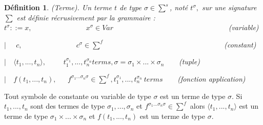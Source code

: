 \documentclass[9pt,openany]{book}
\newtheorem{definition}{D\'efinition}[section]
\begin{document}
\begin{definition} (Terme).
Un terme $t$ de type $\sigma \in \sum^{s}$, not\'e $t^{\sigma},$ sur une signature $\sum$ est d\'efinie r\'ecrusivement par la grammaire :\\
$t^{\sigma} ::= x,$ ~~~~~~~~~~~~~~$x^{\sigma} \in Var$ ~~~~~~~~~~~~~~~~~~~~~~~~~~~~~~ (variable) \par
$|$~~ $c,$ ~~~~~~~~~~~~~~$c^{\sigma} \in \sum^{f}$ ~~~~~~~~~~~~~~~~~~~~~~~~~~~~~~~~(constant) \par
$|$~~$\langle t_{1},...,t_{n}\rangle,$~~~~ $t_{1}^{\sigma_{1}},...,t_{n}^{\sigma_{n}} terms, \sigma = \sigma_{1} \times ... \times \sigma_{n}$~~~~(tuple) \par
$|$~~$f(t_{1},...,t_{n}),$~~~$f^{\sigma_{1} ...\sigma_{n} \sigma} \in \sum^{f}, t_{1}^{\sigma_{1}},...,t_{n}^{\sigma_{n}} ~terms$~~~~(fonction application)
\end{definition}




	Tout symbole de constante ou variable de type $\sigma$ est un terme de type $\sigma$. Si $t_{1},...,t_{n}$ sont des termes de type $\sigma_{1},...,\sigma_{n}$ et $f^{\sigma_{1} ...\sigma_{n} \sigma} \in \sum^{f}$ alors $\langle t_{1},...,t_{n}\rangle$ est un terme de type $\sigma_{1} \times ... \times \sigma_{n}$ et $f(t_{1},...,t_{n})$ est un terme de type $\sigma$.\par
\end{document}
